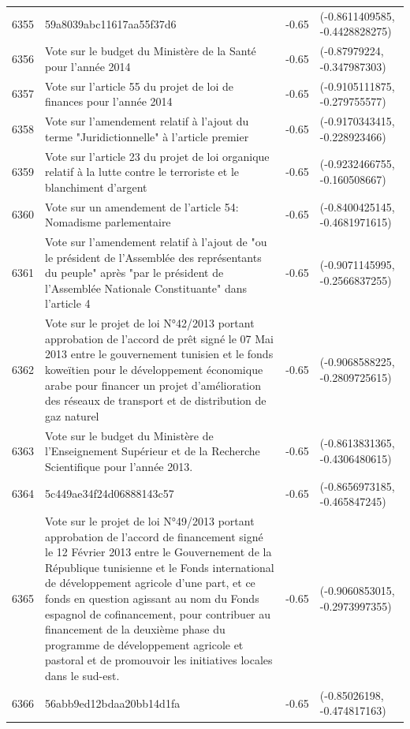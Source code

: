 \begin{table}[ht]
\begin{tabular}{rlrl}
  6355 & 59a8039abc11617aa55f37d6 & -0.65 & (-0.8611409585, -0.4428828275) \\ 
  6356 & Vote sur le budget du Ministère de la Santé pour l'année 2014 & -0.65 & (-0.87979224, -0.347987303) \\ 
  6357 & Vote sur l'article 55 du projet de loi de finances pour l'année 2014 & -0.65 & (-0.9105111875, -0.279755577) \\ 
  6358 & Vote sur l'amendement relatif à l'ajout du terme "Juridictionnelle" à l'article premier & -0.65 & (-0.9170343415, -0.228923466) \\ 
  6359 & Vote sur l'article 23 du projet de loi organique relatif à la lutte contre le terroriste et le blanchiment d'argent & -0.65 & (-0.9232466755, -0.160508667) \\ 
  6360 & Vote sur un amendement de l'article 54: Nomadisme parlementaire & -0.65 & (-0.8400425145, -0.4681971615) \\ 
  6361 & Vote sur l'amendement relatif à l'ajout de "ou le président de l'Assemblée des représentants du peuple" après "par le président de l’Assemblée Nationale Constituante" dans l'article 4 & -0.65 & (-0.9071145995, -0.2566837255) \\ 
  6362 & Vote sur le projet de loi N°42/2013 portant approbation de l'accord de prêt signé le 07 Mai 2013 entre le gouvernement tunisien et le fonds koweïtien pour le développement économique arabe pour financer un projet d'amélioration des réseaux de transport et de distribution de gaz naturel & -0.65 & (-0.9068588225, -0.2809725615) \\ 
  6363 & Vote sur le budget du Ministère de l'Enseignement Supérieur et de la Recherche Scientifique pour l'année 2013. & -0.65 & (-0.8613831365, -0.4306480615) \\ 
  6364 & 5c449ae34f24d06888143c57 & -0.65 & (-0.8656973185, -0.465847245) \\ 
  6365 & Vote sur le projet de loi N°49/2013 portant approbation de l'accord de financement signé le 12 Février 2013 entre le Gouvernement de la République tunisienne et le Fonds international de développement agricole d'une part, et ce fonds en question agissant au nom du Fonds espagnol de cofinancement, pour contribuer au financement de la deuxième phase du programme de développement agricole et pastoral et de promouvoir les initiatives locales dans le sud-est. & -0.65 & (-0.9060853015, -0.2973997355) \\ 
  6366 & 56abb9ed12bdaa20bb14d1fa & -0.65 & (-0.85026198, -0.474817163) \\ 

\end{tabular}
\end{table}
